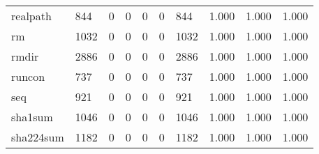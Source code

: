 \begin{longtable}{lp{2.0cm}p{2.0cm}p{2.0cm}p{2.0cm}p{2.0cm}p{2.0cm}p{2.0cm}p{2.0cm}p{2.0cm}}
realpath  &                    844 &                                  0 &                                 0 &                                0 &                                 0 &                             844 &                                1.000 &                                  1.000 &                                1.000 \\
rm        &                   1032 &                                  0 &                                 0 &                                0 &                                 0 &                            1032 &                                1.000 &                                  1.000 &                                1.000 \\
rmdir     &                   2886 &                                  0 &                                 0 &                                0 &                                 0 &                            2886 &                                1.000 &                                  1.000 &                                1.000 \\
runcon    &                    737 &                                  0 &                                 0 &                                0 &                                 0 &                             737 &                                1.000 &                                  1.000 &                                1.000 \\
seq       &                    921 &                                  0 &                                 0 &                                0 &                                 0 &                             921 &                                1.000 &                                  1.000 &                                1.000 \\
sha1sum   &                   1046 &                                  0 &                                 0 &                                0 &                                 0 &                            1046 &                                1.000 &                                  1.000 &                                1.000 \\
sha224sum &                   1182 &                                  0 &                                 0 &                                0 &                                 0 &                            1182 &                                1.000 &                                  1.000 &                                1.000 \\

\end{longtable}
